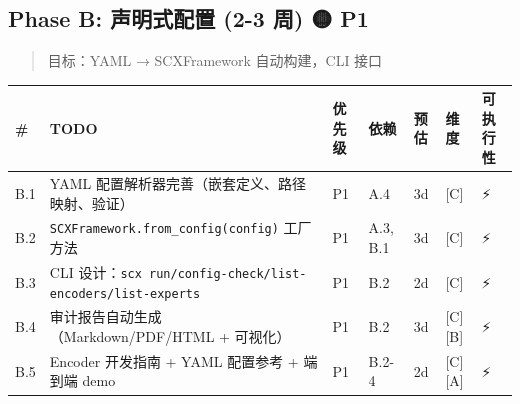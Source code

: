 \documentclass[
  12pt,
]{ctexart}
\begin{document}
\subsection{Phase B: 声明式配置 (2-3 周) 🟡
P1}\label{phase-b-ux58f0ux660eux5f0fux914dux7f6e-2-3-ux5468-p1}

\begin{quote}
目标：YAML → SCXFramework 自动构建，CLI 接口
\end{quote}

\begin{longtable}[]{@{}
  >{\raggedright\arraybackslash}p{}
  >{\raggedright\arraybackslash}p{}
  >{\raggedright\arraybackslash}p{}
  >{\raggedright\arraybackslash}p{}
  >{\raggedright\arraybackslash}p{}
  >{\raggedright\arraybackslash}p{}
  >{\raggedright\arraybackslash}p{}@{}}
\toprule\noalign{}
\begin{minipage}[b]{\linewidth}\raggedright
\#
\end{minipage} & \begin{minipage}[b]{\linewidth}\raggedright
TODO
\end{minipage} & \begin{minipage}[b]{\linewidth}\raggedright
优先级
\end{minipage} & \begin{minipage}[b]{\linewidth}\raggedright
依赖
\end{minipage} & \begin{minipage}[b]{\linewidth}\raggedright
预估
\end{minipage} & \begin{minipage}[b]{\linewidth}\raggedright
维度
\end{minipage} & \begin{minipage}[b]{\linewidth}\raggedright
可执行性
\end{minipage} \\
\midrule\noalign{}
\endhead
\bottomrule\noalign{}
\endlastfoot
B.1 & YAML 配置解析器完善（嵌套定义、路径映射、验证） & P1 & A.4 & 3d &
{[}C{]} & ⚡ \\
B.2 & \texttt{SCXFramework.from\_config(config)} 工厂方法 & P1 & A.3,
B.1 & 3d & {[}C{]} & ⚡ \\
B.3 & CLI
设计：\texttt{scx\ run/config-check/list-encoders/list-experts} & P1 &
B.2 & 2d & {[}C{]} & ⚡ \\
B.4 & 审计报告自动生成（Markdown/PDF/HTML + 可视化） & P1 & B.2 & 3d &
{[}C{]}{[}B{]} & ⚡ \\
B.5 & Encoder 开发指南 + YAML 配置参考 + 端到端 demo & P1 & B.2-4 & 2d &
{[}C{]}{[}A{]} & ⚡ \\
\end{longtable}
\end{document}
